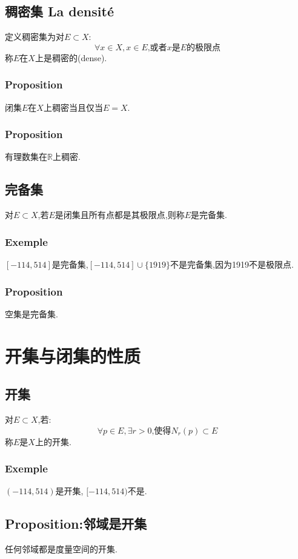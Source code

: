 \documentclass[12pt, a4paper, oneside]{ctexbook}
\newcommand{\R }{\mathbb{R}}%
\begin{document}
  \subsection{稠密集 La densité}
  定义稠密集为对$E\subset X$:
  $$
  \forall x\in X, x\in E\text{,或者}x{是}E{的极限点}
  $$
  称$E$在$X$上是稠密的(dense).
  \subsubsection{Proposition}
  闭集$E$在$X$上稠密当且仅当$E=X$.
  \subsubsection{Proposition}
  有理数集在$\R$上稠密.

  \subsection{完备集}
  对$E\subset X$,若$E$是闭集且所有点都是其极限点,则称$E$是完备集.
  \subsubsection{Exemple}
  $[-114,514]$是完备集,$[-114,514]\cup\{1919\}$不是完备集,因为1919不是极限点.
  \subsubsection{Proposition}
  空集是完备集.

\section{开集与闭集的性质}
  \subsection{开集}
  对$E\subset X$,若:
  $$
    \forall p\in E, \exists r>0\text{,使得}N_r(p)\subset E
  $$称$E$是$X$上的开集.
  \subsubsection{Exemple}
  $(-114,514)$是开集, $[-114,514)$不是.

  \subsection{Proposition:邻域是开集}
  任何邻域都是度量空间的开集.
\end{document}
